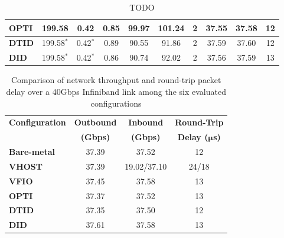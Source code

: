 \begin{table*}[t]
{\begin{tabular}{|l|c|c|c|c|c|c|c|c|c|}
\textbf{OPTI}       & 199.58          & 0.42              & 0.85            & 99.97             & 101.24                                & 2                                  & 37.55                                                              & 37.58                                                             & 12                                                              \\ \hline
\textbf{DTID}       & 199.58$^*$      & 0.42$^*$          & 0.89            & 90.55             & 91.86                                 & 2                                  & 37.59                                                              & 37.60                                                             & 12                                                              \\ \hline
\textbf{DID}        & 199.58$^*$      & 0.42$^*$          & 0.86            & 90.74             & 92.02                                 & 2                                  & 37.56                                                              & 37.59                                                             & 13                                                              \\ \hline
\end{tabular}%
}
\caption{TODO}
\label{tab:cpu_network_io}
\end{table*}

\begin{table}
\renewcommand{\arraystretch}{1.2}
\small
\begin{center}
\begin{tabular}{|l|c|c|c|} \hline
{\bf Configuration} & {\bf Outbound} & {\bf Inbound} & {\bf Round-Trip} \\
                    & {\bf (Gbps)}   & {\bf (Gbps)}  & {\bf Delay ($\boldsymbol{\mu}$s)} \\ \hline
{\bf Bare-metal} & 37.39 & 37.52 & 12 \\ \hline
{\bf VHOST}      & 37.39 & 19.02/37.10 & 24/18\\ \hline
{\bf VFIO}       & 37.45 & 37.58 & 13 \\ \hline
{\bf OPTI}       & 37.37 & 37.52 & 13 \\ \hline
{\bf DTID}       & 37.35 & 37.50 & 12 \\ \hline
{\bf DID}        & 37.61 & 37.58 & 13 \\ \hline
\end{tabular}
\end{center}
\vspace{-0.1in}
\caption{Comparison of network throughput and round-trip
packet delay over a 40Gbps Infiniband link among the six
evaluated configurations}
\label{tab:network_performance}
\vspace{-0.1in}
\end{table}

